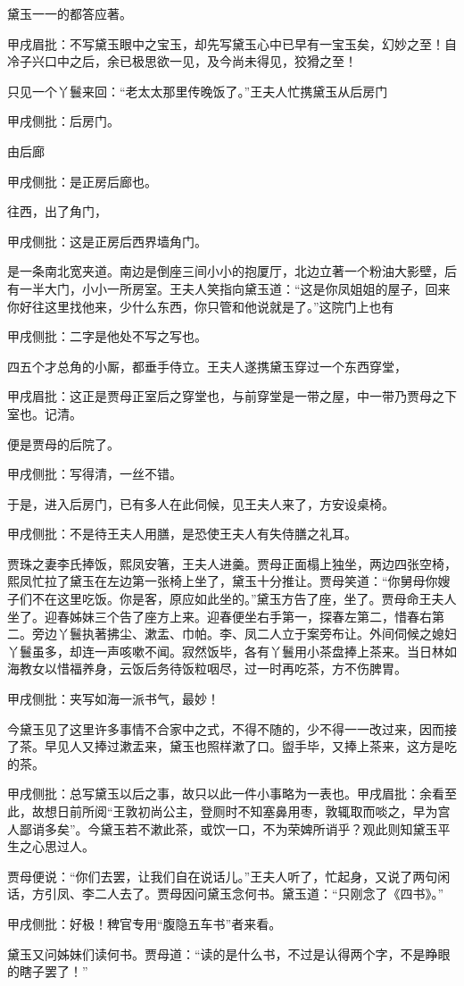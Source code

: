 \begin{parag}
    黛玉一一的都答应著。\begin{note}甲戌眉批：不写黛玉眼中之宝玉，却先写黛玉心中已早有一宝玉矣，幻妙之至！自冷子兴口中之后，余已极思欲一见，及今尚未得见，狡猾之至！\end{note}只见一个丫鬟来回：“老太太那里传晚饭了。”王夫人忙携黛玉从后房门\begin{note}甲戌侧批：后房门。\end{note}由后廊\begin{note}甲戌侧批：是正房后廊也。\end{note}往西，出了角门，\begin{note}甲戌侧批：这是正房后西界墙角门。\end{note}是一条南北宽夹道。南边是倒座三间小小的抱厦厅，北边立著一个粉油大影壁，后有一半大门，小小一所房室。王夫人笑指向黛玉道：“这是你凤姐姐的屋子，回来你好往这里找他来，少什么东西，你只管和他说就是了。”这院门上也有\begin{note}甲戌侧批：二字是他处不写之写也。\end{note}四五个才总角的小厮，都垂手侍立。王夫人遂携黛玉穿过一个东西穿堂，\begin{note}甲戌眉批：这正是贾母正室后之穿堂也，与前穿堂是一带之屋，中一带乃贾母之下室也。记清。\end{note}便是贾母的后院了。\begin{note}甲戌侧批：写得清，一丝不错。\end{note}于是，进入后房门，已有多人在此伺候，见王夫人来了，方安设桌椅。\begin{note}甲戌侧批：不是待王夫人用膳，是恐使王夫人有失侍膳之礼耳。\end{note}贾珠之妻李氏捧饭，熙凤安箸，王夫人进羹。贾母正面榻上独坐，两边四张空椅，熙凤忙拉了黛玉在左边第一张椅上坐了，黛玉十分推让。贾母笑道：“你舅母你嫂子们不在这里吃饭。你是客，原应如此坐的。”黛玉方告了座，坐了。贾母命王夫人坐了。迎春姊妹三个告了座方上来。迎春便坐右手第一，探春左第二，惜春右第二。旁边丫鬟执著拂尘、漱盂、巾帕。李、凤二人立于案旁布让。外间伺候之媳妇丫鬟虽多，却连一声咳嗽不闻。寂然饭毕，各有丫鬟用小茶盘捧上茶来。当日林如海教女以惜福养身，云饭后务待饭粒咽尽，过一时再吃茶，方不伤脾胃。\begin{note}甲戌侧批：夹写如海一派书气，最妙！\end{note}今黛玉见了这里许多事情不合家中之式，不得不随的，少不得一一改过来，因而接了茶。早见人又捧过漱盂来，黛玉也照样漱了口。盥手毕，又捧上茶来，这方是吃的茶。\begin{note}甲戌侧批：总写黛玉以后之事，故只以此一件小事略为一表也。甲戌眉批：余看至此，故想日前所阅“王敦初尚公主，登厕时不知塞鼻用枣，敦辄取而啖之，早为宫人鄙诮多矣”。今黛玉若不漱此茶，或饮一口，不为荣婢所诮乎？观此则知黛玉平生之心思过人。\end{note}贾母便说：“你们去罢，让我们自在说话儿。”王夫人听了，忙起身，又说了两句闲话，方引凤、李二人去了。贾母因问黛玉念何书。黛玉道：“只刚念了《四书》。”\begin{note}甲戌侧批：好极！稗官专用“腹隐五车书”者来看。\end{note}黛玉又问姊妹们读何书。贾母道：“读的是什么书，不过是认得两个字，不是睁眼的瞎子罢了！”
\end{parag}


